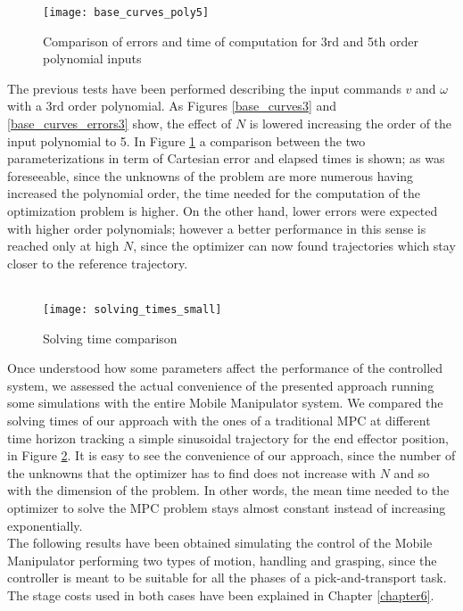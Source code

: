 \begin{figure}[h!]
	\centering
	\texttt{[image: base\_curves\_poly5]}
	\caption{Comparison of errors and time of computation for 3rd and 5th order polynomial inputs}
	\label{base_curves_poly5}
\end{figure}
The previous tests have been performed describing the input commands $v$ and $\omega$ with a 3rd order polynomial. As Figures \ref{base_curves3} and \ref{base_curves_errors3} show, the effect of $N$ is lowered increasing the order of the input polynomial to 5. In Figure \ref{base_curves_poly5} a comparison between the two parameterizations in term of Cartesian error and elapsed times is shown; as was foreseeable, since the unknowns of the problem are more numerous having increased the polynomial order, the time needed for the computation of the optimization problem is higher. On the other hand, lower errors were expected with higher order polynomials; however a better performance in this sense is reached only at high $N$, since the optimizer can now found trajectories which stay closer to the reference trajectory.
\\\\
\begin{figure}[h!]
	\centering
	\texttt{[image: solving\_times\_small]}
	\caption{Solving time comparison}
	\label{solving_times}
\end{figure}
Once understood how some parameters affect the performance of the controlled system, we assessed the actual convenience of the presented approach running some simulations with the entire Mobile Manipulator system. We compared the solving times of our approach with the ones of a traditional MPC at different time horizon tracking a simple sinusoidal trajectory for the end effector position, in Figure \ref{solving_times}. It is easy to see the convenience of our approach, since the number of the unknowns that the optimizer has to find does not increase with $N$ and so with the dimension of the problem. In other words, the mean time needed to the optimizer to solve the MPC problem stays almost constant instead of increasing exponentially.\\
The following results have been obtained simulating the control of the Mobile Manipulator performing two types of motion, handling and grasping, since the controller is meant to be suitable for all the phases of a pick-and-transport task. The stage costs used in both cases have been explained in Chapter \ref{chapter6}.
